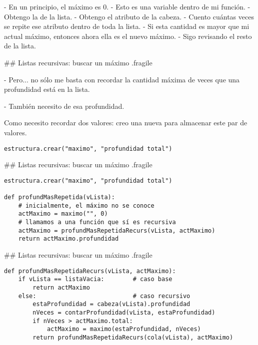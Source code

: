 \vspace{1ex}

- En un principio, el máximo es 0.
    - Esto es una variable dentro de mi función.
- Obtengo la  de la lista.
- Obtengo el atributo  de la cabeza.
- Cuento cuántas veces se repite ese atributo dentro de toda la lista.
- Si esta cantidad es mayor que mi actual máximo, entonces ahora ella es
el nuevo máximo.
- Sigo revisando el resto de la lista.


## Listas recursivas: buscar un máximo {.fragile}


- Pero... no sólo me basta con recordar la cantidad máxima de veces que
una profundidad está en la lista.

\pause

- También necesito  de esa profundidad.

\pause

\bgnblockidea
Como necesito recordar dos valores: creo una nueva  para almacenar
este par de valores.
\trmblockidea

\vspace{2ex}

\begin{lstlisting}[style=frame02]
estructura.crear("maximo", "profundidad total")
\end{lstlisting}

## Listas recursivas: buscar un máximo {.fragile}


\begin{lstlisting}[style=frame02]
estructura.crear("maximo", "profundidad total")

def profundMasRepetida(vLista):
    # inicialmente, el máximo no se conoce
    actMaximo = maximo("", 0)
    # llamamos a una función que sí es recursiva
    actMaximo = profundMasRepetidaRecurs(vLista, actMaximo)
    return actMaximo.profundidad
\end{lstlisting}

## Listas recursivas: buscar un máximo {.fragile}


\begin{lstlisting}[style=frame02]
def profundMasRepetidaRecurs(vLista, actMaximo):
    if vLista == listaVacia:        # caso base
        return actMaximo
    else:                           # caso recursivo
        estaProfundidad = cabeza(vLista).profundidad
        nVeces = contarProfundidad(vLista, estaProfundidad)
        if nVeces > actMaximo.total:
            actMaximo = maximo(estaProfundidad, nVeces)
        return profundMasRepetidaRecurs(cola(vLista), actMaximo)
\end{lstlisting}


